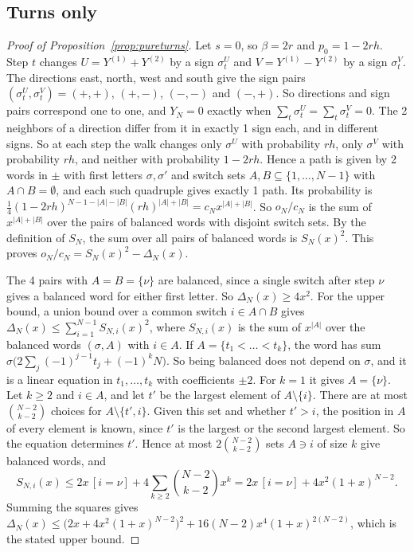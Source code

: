 \subsection{Turns only}

\begin{proof}[Proof of Proposition~\ref{prop:pureturns}]
Let $s=0$, so $\beta=2r$ and $p_0=1-2rh$. Step $t$ changes $U=Y^{(1)}+Y^{(2)}$ by a sign
$\sigma^U_t$ and $V=Y^{(1)}-Y^{(2)}$ by a sign $\sigma^V_t$. The directions east, north, west and
south give the sign pairs $(\sigma^U_t,\sigma^V_t)=(+,+)$, $(+,-)$, $(-,-)$ and $(-,+)$. So
directions and sign pairs correspond one to one, and $Y_N=0$ exactly when $\sum_t\sigma^U_t=\sum_t\sigma^V_t=0$. The 2 neighbors of a direction
differ from it in exactly 1 sign each, and in different signs. So at each step the walk changes
only $\sigma^U$ with probability $rh$, only $\sigma^V$ with probability $rh$, and neither with
probability $1-2rh$. Hence a path is given by 2 words in $\pm$ with first letters $\sigma,\sigma'$
and switch sets $A,B\subseteq\{1,\dots,N-1\}$ with $A\cap B=\emptyset$, and each such quadruple
gives exactly 1 path. Its probability is
$\frac14(1-2rh)^{N-1-\lvert A\rvert-\lvert B\rvert}(rh)^{\lvert A\rvert+\lvert B\rvert}
=c_Nx^{\lvert A\rvert+\lvert B\rvert}$. So $o_N/c_N$ is the sum of
$x^{\lvert A\rvert+\lvert B\rvert}$ over the pairs of balanced words with disjoint switch sets. By
the definition of $S_N$, the sum over all pairs of balanced words is $S_N(x)^2$. This proves
$o_N/c_N=S_N(x)^2-\Delta_N(x)$.

The 4 pairs with $A=B=\{\nu\}$ are balanced, since a single switch after step $\nu$ gives a
balanced word for either first letter. So $\Delta_N(x)\ge4x^2$. For the upper bound, a union bound
over a common switch $i\in A\cap B$ gives $\Delta_N(x)\le\sum_{i=1}^{N-1}S_{N,i}(x)^2$, where
$S_{N,i}(x)$ is the sum of $x^{\lvert A\rvert}$ over the balanced words $(\sigma,A)$ with $i\in A$.
If $A=\{t_1<\dots<t_k\}$, the word has sum $\sigma\bigl(2\sum_j(-1)^{j-1}t_j+(-1)^kN\bigr)$. So being
balanced does not depend on $\sigma$, and it is a linear equation in $t_1,\dots,t_k$ with
coefficients $\pm2$. For $k=1$ it gives $A=\{\nu\}$. Let $k\ge2$ and $i\in A$, and let $t'$ be the
largest element of $A\setminus\{i\}$. There are at most $\binom{N-2}{k-2}$ choices for
$A\setminus\{t',i\}$. Given this set and whether $t'>i$, the position in $A$ of every element is
known, since $t'$ is the largest or the second largest element. So the equation determines $t'$.
Hence at most $2\binom{N-2}{k-2}$ sets $A\ni i$ of size $k$ give balanced words, and
\[
 S_{N,i}(x)\le2x\,[i=\nu]+4\sum_{k\ge2}\binom{N-2}{k-2}x^k=2x\,[i=\nu]+4x^2(1+x)^{N-2}.
\]
Summing the squares gives
$\Delta_N(x)\le\bigl(2x+4x^2(1+x)^{N-2}\bigr)^2+16(N-2)x^4(1+x)^{2(N-2)}$, which is the stated upper
bound.


\end{proof}
